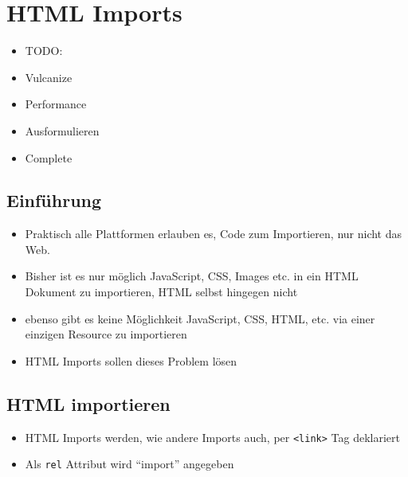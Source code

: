 \section{HTML Imports}\label{html-imports}

\begin{itemize}
\item
  TODO:
\item
  Vulcanize
\item
  Performance
\item
  Ausformulieren
\item
  Complete
\end{itemize}

\subsection{Einführung}\label{einfuxfchrung}

\begin{itemize}
\tightlist
\item
  Praktisch alle Plattformen erlauben es, Code zum Importieren, nur
  nicht das Web.
\item
  Bisher ist es nur möglich JavaScript, CSS, Images etc. in ein HTML
  Dokument zu importieren, HTML selbst hingegen nicht
\item
  ebenso gibt es keine Möglichkeit JavaScript, CSS, HTML, etc. via einer
  einzigen Resource zu importieren
\item
  HTML Imports sollen dieses Problem lösen
\end{itemize}

\subsection{HTML importieren}\label{html-importieren}

\begin{itemize}
\tightlist
\item
  HTML Imports werden, wie andere Imports auch, per
  \texttt{\textless{}link\textgreater{}} Tag deklariert
\item
  Als \texttt{rel} Attribut wird ``import'' angegeben
\end{itemize}

\begin{Shaded}
\begin{Highlighting}[]
  \KeywordTok{>}
\end{Highlighting}
\end{Shaded}

